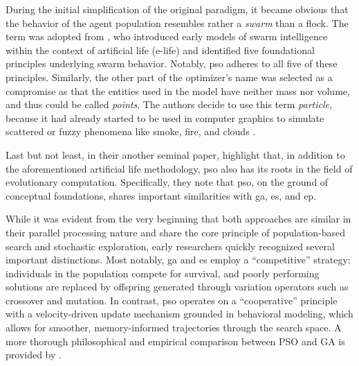 {During the initial simplification of the original paradigm, it became obvious that the behavior of the agent population resembles rather a \textit{swarm} than a flock. The term was adopted from \citet{millonas1993swarms}, who introduced early models of swarm intelligence within the context of artificial life (e-life) and identified five foundational principles underlying swarm behavior. Notably, \acrshort{pso} adheres to all five of these principles.
Similarly, the other part of the optimizer's name was selected as a compromise as that the entities used in the model have neither mass nor volume, and thus could be called \textit{points}. The authors decide to use this term \textit{particle}, because it had already started to be used in computer graphics to simulate scattered or fuzzy phenomena like smoke, fire, and clouds \citep{reeves1983particle}.


Last but not least, in their another seminal paper, \citet{eberhart1995new} highlight that, in addition to the aforementioned artificial life methodology, \acrlong{pso} also has its roots in the field of evolutionary computation. Specifically, they note that \acrshort{pso}, on the ground of conceptual foundations, shares important similarities with \acrfull{ga}, \acrfull{es}, and \acrfull{ep}.

While it was evident from the very beginning that both approaches are similar in their parallel processing nature and share the core principle of population-based search and stochastic exploration, early researchers quickly recognized several important distinctions. Most notably,  \acrshort{ga} and \acrshort{es} employ a ``competitive'' strategy: individuals in the population compete for survival, and poorly performing solutions are replaced by offspring generated through variation operators such as crossover and mutation. In contrast, \acrshort{pso} operates on a ``cooperative'' principle with a velocity-driven update mechanism grounded in behavioral modeling, which allows for smoother, memory-informed trajectories through the search space. A more thorough philosophical and empirical comparison between PSO and GA is provided by \citet{angeline1998evolutionary}.





}
